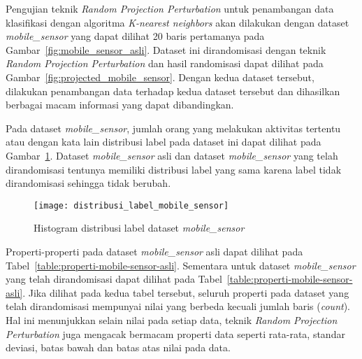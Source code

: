 Pengujian teknik \textit{Random Projection Perturbation} untuk penambangan data klasifikasi dengan algoritma \textit{K-nearest neighbors} akan dilakukan dengan dataset \textit{mobile\_sensor} yang dapat dilihat 20 baris pertamanya pada Gambar~\ref{fig:mobile_sensor_asli}. Dataset ini dirandomisasi dengan teknik \textit{Random Projection Perturbation} dan hasil randomisasi dapat dilihat pada Gambar~\ref{fig:projected_mobile_sensor}. Dengan kedua dataset tersebut, dilakukan penambangan data terhadap kedua dataset tersebut dan dihasilkan berbagai macam informasi yang dapat dibandingkan.

Pada dataset \textit{mobile\_sensor}, jumlah orang yang melakukan aktivitas tertentu atau dengan kata lain distribusi label pada dataset ini dapat dilihat pada Gambar~\ref{fig:distribusi_label_mobile_sensor}. Dataset \textit{mobile\_sensor} asli dan dataset \textit{mobile\_sensor} yang telah dirandomisasi tentunya memiliki distribusi label yang sama karena label tidak dirandomisasi sehingga tidak berubah.

\begin{figure}
	\centering
	\texttt{[image: distribusi\_label\_mobile\_sensor]}
	\caption{Histogram distribusi label dataset \textit{mobile\_sensor}}
	\label{fig:distribusi_label_mobile_sensor}
\end{figure}

Properti-properti pada dataset \textit{mobile\_sensor} asli dapat dilihat pada Tabel~\ref{table:properti-mobile-sensor-asli}. Sementara untuk dataset \textit{mobile\_sensor} yang telah dirandomisasi dapat dilihat pada Tabel~\ref{table:properti-mobile-sensor-asli}. Jika dilihat pada kedua tabel tersebut, seluruh properti pada dataset yang telah dirandomisasi mempunyai nilai yang berbeda kecuali jumlah baris (\textit{count}). Hal ini menunjukkan selain nilai pada setiap data, teknik \textit{Random Projection Perturbation} juga mengacak bermacam properti data seperti rata-rata, standar deviasi, batas bawah dan batas atas nilai pada data.

